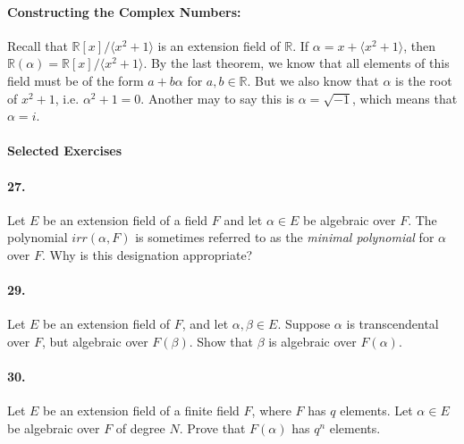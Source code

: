 \documentclass[10pt,a4paper]{article}
\begin{document}
\paragraph{Constructing the Complex Numbers:} Recall that $\mathbb{R}[x]/\langle x^2 +1 \rangle $ is an extension field of $\mathbb{R}$. If $\alpha = x + \langle x^2 +1 \rangle$, then $\mathbb{R}(\alpha) = \mathbb{R}[x]/ \langle x^2 +1 \rangle$. By the last theorem, we know that all elements of this field must be of the form $a+b\alpha$ for $a,b \in \mathbb{R}$. But we also know that $\alpha$ is the root of $x^2+1$, i.e. $\alpha^2 + 1 = 0$. Another may to say this is $\alpha = \sqrt{-1}$, which means that $\alpha = i$.

\paragraph{Selected Exercises}

\paragraph{27.} Let $E$ be an extension field of a field $F$ and let $\alpha \in E$ be algebraic over $F$. The polynomial $irr(\alpha, F)$ is sometimes referred to as the \textit{minimal polynomial} for $\alpha$ over $F$. Why is this designation appropriate?

\paragraph{29.} Let $E$ be an extension field of $F$, and let $\alpha, \beta \in E$. Suppose $\alpha$ is transcendental over $F$, but algebraic over $F(\beta)$. Show that $\beta$ is algebraic over $F(\alpha)$.

\paragraph{30.} Let $E$ be an extension field of a finite field $F$, where $F$ has $q$ elements. Let $\alpha \in E$ be algebraic over $F$ of degree $N$. Prove that $F(\alpha)$ has $q^n$ elements.
\end{document}
